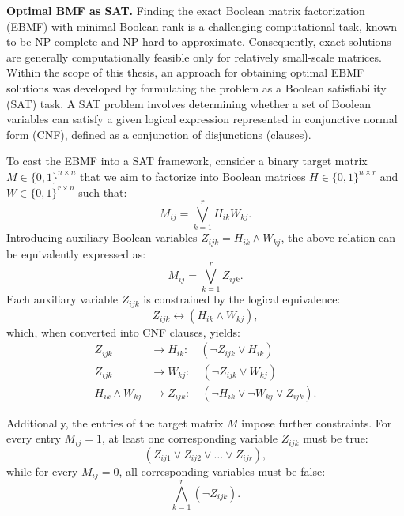 \textbf{Optimal BMF as SAT.} 
Finding the exact Boolean matrix factorization (EBMF) with minimal Boolean rank is a challenging computational task, known to be NP-complete\cite{orlin_contentment_1977} and NP-hard to approximate\cite{gruber_inapproximability_2007}. Consequently, exact solutions are generally computationally feasible only for relatively small-scale matrices. Within the scope of this thesis, an approach for obtaining optimal EBMF solutions was developed by formulating the problem as a Boolean satisfiability (SAT) task. A SAT problem involves determining whether a set of Boolean variables can satisfy a given logical expression represented in conjunctive normal form (CNF), defined as a conjunction of disjunctions (clauses).

To cast the EBMF into a SAT framework, consider a binary target matrix $M \in \{0,1\}^{n\times n}$ that we aim to factorize into Boolean matrices $H\in\{0,1\}^{n\times r}$ and $W\in\{0,1\}^{r\times n}$ such that:
\begin{equation*}
M_{ij} = \bigvee_{k=1}^{r} H_{ik} W_{kj}.
\end{equation*}
Introducing auxiliary Boolean variables $Z_{ijk} = H_{ik} \wedge W_{kj}$, the above relation can be equivalently expressed as:
\begin{equation}
M_{ij} = \bigvee_{k=1}^{r} Z_{ijk}.
\end{equation}
Each auxiliary variable $Z_{ijk}$ is constrained by the logical equivalence:
\begin{equation*}
Z_{ijk} \leftrightarrow (H_{ik} \wedge W_{kj}),
\end{equation*}
which, when converted into CNF clauses, yields:
\begin{align*}
Z_{ijk} &\rightarrow H_{ik}: \quad (\neg Z_{ijk} \vee H_{ik}) \\
Z_{ijk} &\rightarrow W_{kj}: \quad (\neg Z_{ijk} \vee W_{kj}) \\
H_{ik} \wedge W_{kj} &\rightarrow Z_{ijk}: \quad (\neg H_{ik} \vee \neg W_{kj} \vee Z_{ijk}).
\end{align*}

Additionally, the entries of the target matrix $M$ impose further constraints. For every entry $M_{ij}=1$, at least one corresponding variable $Z_{ijk}$ must be true:
\begin{equation*}
(Z_{ij1} \vee Z_{ij2} \vee \dots \vee Z_{ijr}),
\end{equation*}
while for every $M_{ij}=0$, all corresponding variables must be false:
\begin{equation*}
\bigwedge_{k=1}^{r} (\neg Z_{ijk}).
\end{equation*}

